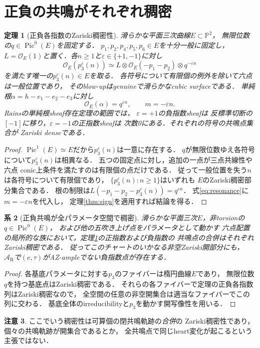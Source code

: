 \documentclass[11pt,a4paper]{ltjsarticle}
\newtheorem{theorem}{定理}[section]
\newtheorem{corollary}[theorem]{系}
\theoremstyle{definition}\newtheorem{remark}[theorem]{注意}
\DeclareMathOperator{\Pic}{Pic}
\begin{document}
\section{正負の共鳴がそれぞれ稠密}
\begin{theorem}[正負各指数のZariski稠密性]
\label{thm:dense-both}
滑らかな平面三次曲線$E\subset\mathbb P^2$，
無限位数の$q\in\Pic^0(E)$を固定する．
$p_1,p_2,p_4,p_5,p_6\in E$を十分一般に固定し，
$L=\mathcal O_E(1)$と置く．各$n\ge1$と$\varepsilon\in\{+1,-1\}$に対し
\[
 \mathcal O_E(p_3^\varepsilon(n))\simeq
 L\otimes\mathcal O_E(-p_1-p_2)\otimes q^{-\varepsilon n}
\]
を満たす唯一の$p_3^\varepsilon(n)\in E$を取る．
各符号について有限個の例外を除いて六点は一般位置であり，
そのblow-upはgenuineで滑らかなcubic surfaceである．
単純根$\alpha=h-e_1-e_2-e_3$に対し
\[
 \mathcal O_E(\alpha)=q^{\varepsilon n},\qquad
 m=-\varepsilon n.
\]
Rainsの単純根sheaf存在定理の範囲では，
$\varepsilon=+1$の負指数sheafは
反標準切断の$[-1]$に移り，$\varepsilon=-1$の正指数sheafは
次数0にある．それぞれの符号の共鳴点集合が
Zariski denseである．
\end{theorem}
\begin{proof}
$\Pic^1(E)\simeq E$だから$p_3^\varepsilon(n)$は一意に存在する．
$q$が無限位数ゆえ各符号について$p_3^\varepsilon(n)$は相異なる．
五つの固定点に対し，追加の一点が三点共線性や六点
conic上条件を満たすのは有限個の点だけである．
従って一般位置を失う$n$は各符号について有限個であり，
$\{p_3^\varepsilon(n):n\ge1\}$はいずれも
$E$のZariski稠密部分集合である．
根の制限は$L(-p_1-p_2-p_3^\varepsilon(n))=q^{\varepsilon n}$．
式\eqref{eq:resonance}に$m=-\varepsilon n$を代入し，
定理\ref{thm:sign}を適用すれば結論を得る．
\end{proof}

\begin{corollary}[正負共鳴が全パラメータ空間で稠密]
\label{cor:dense-total}
滑らかな平面三次$E$，非torsionの$q\in\Pic^0(E)$，
および他の五吹き上げ点をパラメータとして動かす
六点配置の局所的な族において，定理\ref{thm:dense-both}の正指数および負指数の
共鳴点の合併はそれぞれZariski稠密である．
従ってこのチャートのいかなる非空Zariski開部分にも，
$\mathcal A_{\mathrm R}$で$(e,\tau)$がAZ-ampleでない負指数点が存在する．
\end{corollary}
\begin{proof}
各基底パラメータに対する$p_3$のファイバーは楕円曲線$E$であり，
無限位数$q$を持つ基底点はZariski稠密である．
それらの各ファイバーで定理の正負各指数列はZariski稠密なので，
全空間の任意の非空開集合は適当なファイバーでこの列に交わる．
基底全体のirreducibilityと$p_3$を動かす開写像性を用いる．
\end{proof}
\begin{remark}
ここでいう稠密性は可算個の閉共鳴軌跡の\emph{合併}の
Zariski稠密性であり，個々の共鳴軌跡が開集合であるとか，
全共鳴点で同じheart変化が起こるという主張ではない．
\end{remark}
\end{document}
